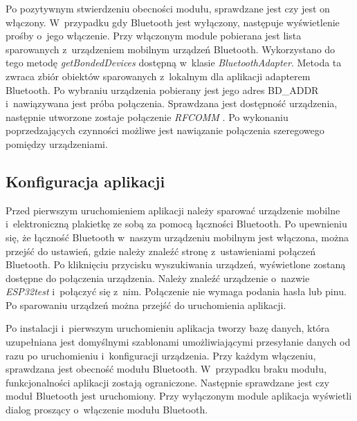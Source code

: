 \documentclass[a4paper,12pt, twoside]{article}
\begin{document}
    	Po pozytywnym stwierdzeniu obecności modułu, sprawdzane jest czy jest on włączony. W~przypadku gdy Bluetooth jest wyłączony, następuje wyświetlenie prośby o~jego włączenie. Przy włączonym module pobierana jest lista sparowanych z~urządzeniem mobilnym urządzeń Bluetooth. Wykorzystano do tego metodę \textit{getBondedDevices}\cite{bonded} dostępną w~klasie \textit{BluetoothAdapter}. Metoda ta zwraca zbiór obiektów sparowanych z~lokalnym dla aplikacji adapterem Bluetooth. Po wybraniu urządzenia pobierany jest jego adres BD\_ADDR i~nawiązywana jest próba połączenia. Sprawdzana jest dostępność urządzenia, następnie utworzone zostaje połączenie \textit{RFCOMM} \cite{rfcomm}. Po wykonaniu poprzedzających czynności możliwe jest nawiązanie połączenia szeregowego pomiędzy urządzeniami.
    	
    	\subsection{Konfiguracja aplikacji}
    	Przed pierwszym uruchomieniem aplikacji należy sparować urządzenie mobilne i~elektroniczną plakietkę ze sobą za pomocą łączności Bluetooth. Po upewnieniu się, że łączność Bluetooth w~naszym urządzeniu mobilnym jest włączona, można przejść do ustawień, gdzie należy znaleźć stronę z~ustawieniami połączeń Bluetooth. Po kliknięciu przycisku wyszukiwania urządzeń, wyświetlone zostaną dostępne do połączenia urządzenia. Należy znaleźć urządzenie o~nazwie \textit{ESP32test} i~połączyć się z~nim. Połączenie nie wymaga podania hasła lub pinu. Po sparowaniu urządzeń można przejść do uruchomienia aplikacji. 
    	
    	Po instalacji i~pierwszym uruchomieniu aplikacja tworzy bazę danych, która uzupełniana jest domyślnymi szablonami umożliwiającymi przesyłanie danych od razu po uruchomieniu i~konfiguracji urządzenia. Przy każdym włączeniu, sprawdzana jest obecność modułu Bluetooth. W~przypadku braku modułu, funkcjonalności aplikacji zostają ograniczone. Następnie sprawdzane jest czy moduł Bluetooth jest uruchomiony. Przy wyłączonym module aplikacja wyświetli dialog proszący o~włączenie modułu Bluetooth.
    	
\end{document}
